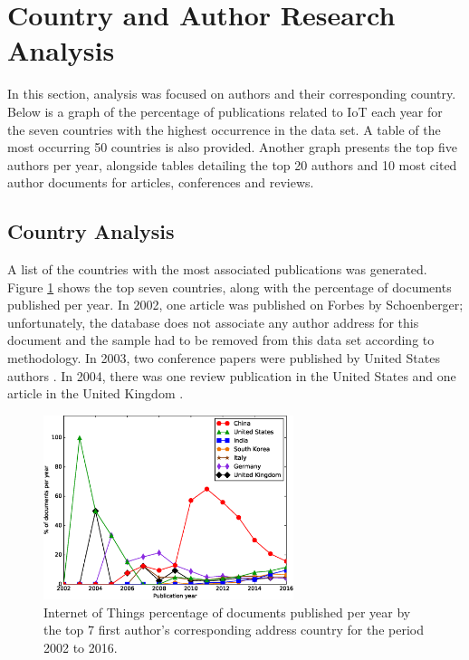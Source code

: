 \documentclass[symmetry,article,accept,moreauthors,pdftex10pt,a4paper]{mdpi}
\newcommand{\figuresWidth}{0.65\textwidth}
\begin{document}
\section{Country and Author Research Analysis}

In this section, analysis was focused on authors and their corresponding country. Below is a graph of the percentage of publications related to IoT each year for the seven countries with the highest occurrence in the data set. A table of the most occurring 50 countries is also provided. Another graph presents the top five authors per year, alongside tables detailing the top 20 authors and 10 most cited author documents for articles, conferences and reviews. 

\subsection{Country Analysis}

A list of the countries with the most associated publications was generated. Figure \ref{fig_countries} shows the top seven countries, along with the percentage of documents published per year. In 2002, one article was published on Forbes by Schoenberger; unfortunately, the database does not associate any author address for this document and the sample had to be removed from this data set according to methodology. In 2003, two conference papers were published by United States authors \cite{Qiu20032661,Traversat2003}. In 2004, there was one review publication in the United States \cite{Gershenfeld200476} and one article in the United Kingdom \cite{ISI:000224027400006}. 

\begin{figure}[H]
	\centering
	\includegraphics[width=\figuresWidth]{./graphs/figure2.eps}
	\caption{Internet of Things percentage of documents published per year by the top 7 first author's corresponding address country for the period 2002 to 2016.}
	\label{fig_countries}
\end{figure}
\end{document}
